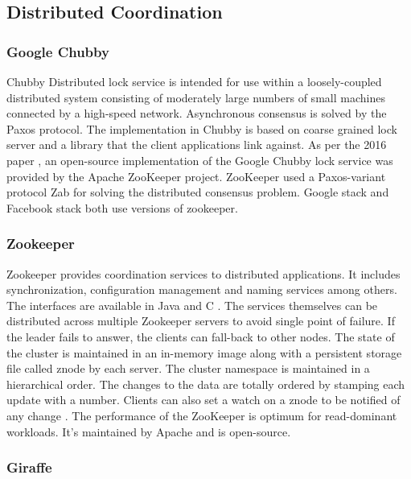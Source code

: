{\subsection{Distributed Coordination}


\subsubsection{Google Chubby \cv}

     Chubby Distributed lock service \cite{www-chubby}
     is intended for use within a loosely-coupled distributed system
     consisting of moderately large numbers of small machines
     connected by a high-speed network. Asynchronous consensus is
     solved by the Paxos protocol. The implementation in Chubby is
     based on coarse grained lock server and a library that the client
     applications link against.  As per the 2016 paper
     \cite{chubby-paper-2016}, an open-source implementation of the
     Google Chubby lock service was provided by the Apache ZooKeeper
     project. ZooKeeper used a Paxos-variant protocol Zab for solving
     the distributed consensus problem.  Google stack and Facebook
     stack both use versions of zookeeper.
     
\subsubsection{Zookeeper \cv}
 
     Zookeeper provides coordination services to distributed applications.
     It includes synchronization, configuration management and naming
     services among others. The interfaces are available in Java and C
     \cite{www-zoo-overiew}. The services themselves can be distributed
     across multiple Zookeeper servers to avoid single point of failure.
     If the leader fails to answer, the clients can fall-back to other
     nodes. The state of the cluster is maintained in an in-memory image
     along with a persistent storage file called znode by each server. The
     cluster namespace is maintained in a hierarchical order. The changes to the
     data are totally ordered \cite{www-zoo-wiki} by stamping each update
     with a number. Clients can also set a watch on a znode to be notified
     of any change \cite{www-zoo-ibm}. The performance of the ZooKeeper
     is optimum for read-dominant workloads. It's maintained by Apache
     and is open-source.

\subsubsection{Giraffe}

}
